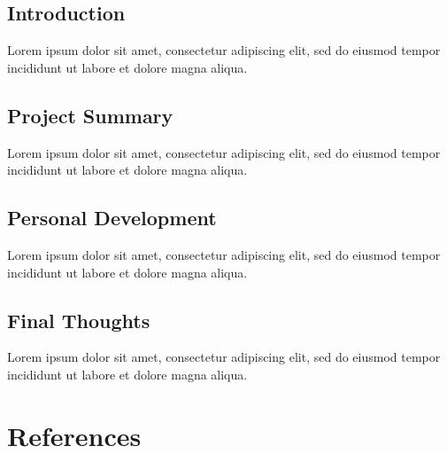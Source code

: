 \documentclass[12pt, a4paper]{article}
\begin{document}

\subsection{Introduction}

Lorem ipsum dolor sit amet, consectetur adipiscing elit, sed do eiusmod tempor incididunt ut labore et dolore magna aliqua.


\subsection{Project Summary}


Lorem ipsum dolor sit amet, consectetur adipiscing elit, sed do eiusmod tempor incididunt ut labore et dolore magna aliqua.


\subsection{Personal Development}

Lorem ipsum dolor sit amet, consectetur adipiscing elit, sed do eiusmod tempor incididunt ut labore et dolore magna aliqua.


\subsection{Final Thoughts}

Lorem ipsum dolor sit amet, consectetur adipiscing elit, sed do eiusmod tempor incididunt ut labore et dolore magna aliqua.

\pagebreak



\section{References}

\renewcommand{\refname}{\vskip -1cm}

\end{document}
